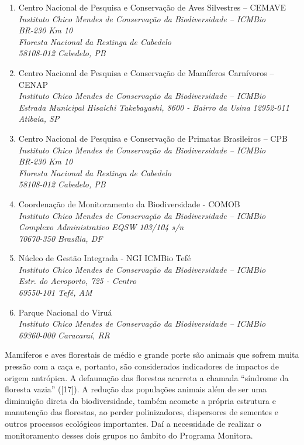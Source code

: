\documentclass[
  letterpaper,
]{scrbook}
\begin{document}
\begin{enumerate}
\def\labelenumi{\arabic{enumi}.}
\item
  Centro Nacional de Pesquisa e Conservação de Aves Silvestres --
  CEMAVE\\
  \emph{Instituto Chico Mendes de Conservação da Biodiversidade --
  ICMBio}\\
  \emph{BR-230 Km 10}\\
  \emph{Floresta Nacional da Restinga de Cabedelo}\\
  \emph{58108-012 Cabedelo, PB}
\item
  Centro Nacional de Pesquisa e Conservação de Mamíferos Carnívoros --
  CENAP\\
  \emph{Instituto Chico Mendes de Conservação da Biodiversidade --
  ICMBio}\\
  \emph{Estrada Municipal Hisaichi Takebayashi, 8600 - Bairro da Usina}
  \emph{12952-011 Atibaia, SP}
\item
  Centro Nacional de Pesquisa e Conservação de Primatas Brasileiros --
  CPB\\
  \emph{Instituto Chico Mendes de Conservação da Biodiversidade --
  ICMBio}\\
  \emph{BR-230 Km 10}\\
  \emph{Floresta Nacional da Restinga de Cabedelo}\\
  \emph{58108-012 Cabedelo, PB}
\item
  Coordenação de Monitoramento da Biodiversidade - COMOB\\
  \emph{Instituto Chico Mendes de Conservação da Biodiversidade --
  ICMBio}\\
  \emph{Complexo Administrativo EQSW 103/104 s/n}\\
  \emph{70670-350 Brasília, DF}
\item
  Núcleo de Gestão Integrada - NGI ICMBio Tefé\\
  \emph{Instituto Chico Mendes de Conservação da Biodiversidade --
  ICMBio}\\
  \emph{Estr. do Aeroporto, 725 - Centro}\\
  \emph{69550-101 Tefé, AM}
\item
  Parque Nacional do Viruá\\
  \emph{Instituto Chico Mendes de Conservação da Biodiversidade --
  ICMBio}\\
  \emph{69360-000 Caracaraí, RR}
\end{enumerate}

Mamíferos e aves florestais de médio e grande porte são animais que
sofrem muita pressão com a caça e, portanto, são considerados
indicadores de impactos de origem antrópica. A defaunação das florestas
acarreta a chamada ``síndrome da floresta vazia'' ({[}17{]}). A redução
das populações animais além de ser uma diminuição direta da
biodiversidade, também acomete a própria estrutura e manutenção das
florestas, ao perder polinizadores, dispersores de sementes e outros
processos ecológicos importantes. Daí a necessidade de realizar o
monitoramento desses dois grupos no âmbito do Programa Monitora.
\end{document}
